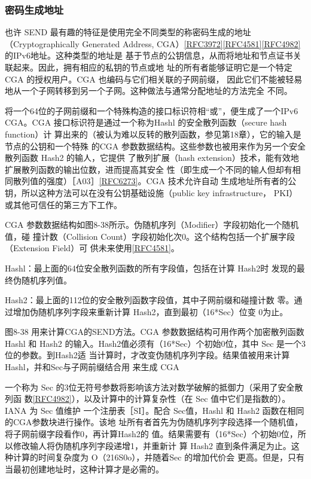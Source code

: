 \subsubsection{密码生成地址}
也许 SEND 最有趣的特征是使用完全不同类型的称密码生成的地址（Cryptographically
Generated Address,
CGA）\href{https://www.rfc-editor.org/rfc/rfc3972}{[RFC3972]}\href{https://www.rfc-editor.org/rfc/rfc4581}{[RFC4581]}\href{https://www.rfc-editor.org/rfc/rfc4982}{[RFC4982]}
的IPv6地址。这种类型的地址是
基于节点的公钥信息，从而将地址和节点证书关联起来。因此，拥有相应的私钥的节点或地
址的所有者能够证明它是一个特定CGA 的授权用户。CGA 也编码与它们相关联的子网前缀，
因此它们不能被轻易地从一个子网转移到另一个子网。这种做法与通常分配地址的方法完全
不同。

将一个64位的子网前缀和一个特殊构造的接口标识符相“或”，便生成了一个IPv6
CGA。CGA 接口标识符是通过一个称为Hashl 的安全散列函数（secure hash function）计
算出来的（被认为难以反转的散列函数，参见第18章），它的输入是节点的公钥和一个特殊
的CGA 参数数据结构。这些参数也被用来作为另一个安全散列函数 Hash2 的输人，它提供
了散列扩展（hash extension）技术，能有效地扩展散列函数的输出位数，进而提高其安全
性（即生成一个不同的输人但却有相同散列值的强度）［A03］\href{https://www.rfc-editor.org/rfc/rfc6273}{[RFC6273]}。CGA
技术允许自动
生成地址所有者的公钥，所以这种方法可以在没有公钥基础设施（public key infrastructure，
PKI） 或其他可信任的第三方下工作。

CGA 参数数据结构如图8-38所示。伪随机序列（Modifier）字段初始化一个随机值，碰
撞计数（Collision Count）字段初始化次0。这个结构包括一个扩展字段（Extension Field）可
供未来使用\href{https://www.rfc-editor.org/rfc/rfc4581}{[RFC4581]}。

Hashl：最上面的64位安全散列函数的所有字段值，包括在计算 Hash2时
发现的最终伪随机序列值。

Hash2：最上面的112位的安全散列函数字段值，其中子网前缀和碰撞计数
零。通过增加伪随机序列字段来重新计算 Hash2，直到最初（16*Sec）位变
0为止。

图8-38 用来计算CGA的SEND方法。CGA 参数数据结构可用作两个加密散列函数 Hashl 和 Hash2
的输入。Hash2值必须有（16*Sec）个初始0位，其中 Sec 是一个3位的参数。到Hash2适
当计算时，才改变伪随机序列字段。结果值被用来计算 Hashl，并和Sec与子网前缀结合用
来生成 CGA

一个称为 Sec 的3位无符号参数将影响该方法对数学破解的抵御力（采用了安全散列函
数\href{https://www.rfc-editor.org/rfc/rfc4982}{[RFC4982]}），以及计算中的计算复杂性（在
Sec 值中它们是指数的）。IANA 为 Sec 值维护
一个注册表［SI］。配合 Sec值，Hashl 和 Hash2 函数在相同的CGA参数块进行操作。该地
址所有者首先为伪随机序列字段选择一个随机值，将子网前缀字段看作0，再计算Hash2的
值。结果需要有（16*Sec）个初始0位，所以修改输人将伪随机序列字段递增1，并重新计
算 Hash2 直到条件满足为止。这种计算的时间复杂度为 O（216S0o），并随着Sec 的增加代价会
更高。但是，只有当最初创建地址时，这种计算才是必需的。

